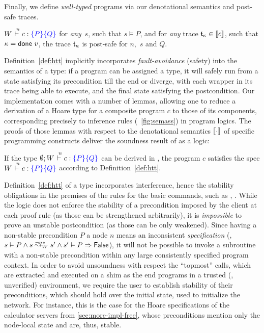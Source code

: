 %
\noindent
%
Finally, we define \emph{well-typed} programs via our denotational
semantics and post-safe traces.
%
\begin{definition}
\label{def:htt}
$W \vd{n} c: \pre{P}\post{Q}$ \Iff for \emph{any}~$s$,
such that $s \vDash P$, and for \emph{any} trace $\mathfrak{t}_{\kappa} \in \llbracket{c}\rrbracket$,
such that $\kappa = \mathsf{done}~v$, the trace $\mathfrak{t}_{\kappa}$ is post-safe for
$n$,~$s$ and $Q$.
\end{definition}
%
%
Definition~\ref{def:htt} implicitly incorporates
\emph{fault-avoidance} (safety) into the semantics of a type: if a
program can be assigned a type, it will safely run from a state
satisfying its precondition till the end or diverge, with each wrapper
in its trace being able to execute, and the final state satisfying the
postcondition.
%
Our implementation comes with a number of lemmas, allowing one to
reduce a derivation of a Hoare type for a composite program $c$ to
those of its components, corresponding precisely to inference rules
(\cf~\cref{fig:semass}) in program logics.
%
The proofs of those lemmas with respect to the denotational semantics
$\llbracket{\cdot}\rrbracket$ of specific programming constructs deliver the
soundness result of \disel as a logic:
%
\begin{theorem}
  If the type $\emptyset; W \vd{n} c: \specK{P} \specK{Q}$ can be
  derived in \disel, the program $c$ satisfies the spec
  $W \vd{n} c: \pre{P}\post{Q}$ according to Definition~\ref{def:htt}.
\end{theorem}
%
Definition~\ref{def:htt} of a type incorporates interference, hence
the stability obligations in the premises of the rules for the basic
commands, such as , .
%
While the logic does not enforce the stability of a precondition
imposed by the client at each proof rule (as those can be strengthened
arbitrarily), it is \emph{impossible} to prove an unstable
postcondition (as those can be only weakened). Since having a
non-stable precondition $P$ \wrt a node $n$ means an inconsistent
\emph{specification} (\ie,
$s \vDash P \aand \ninf{W}{n}{s}{s'} \aand s' \vDash P \Rightarrow
\False$),
it will not be possible to invoke a subroutine with a non-stable
precondition within any large consistently specified program context.
%
In order to avoid unsoundness with respect the ``topmost'' calls,
which are extracted and executed on a shim as the end programs in a
trusted (\ie, unverified) environment, we require the user to
establish stability of their preconditions, which should hold over the
initial state, used to initialize the network.
%
For instance, this is the case for the Hoare specifications of the
calculator servers from \cref{sec:more-impl-free}, whose
preconditions mention only the node-local state and are, thus, stable.

